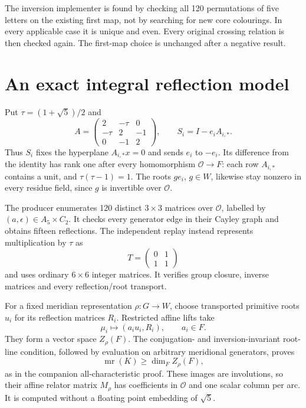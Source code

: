 \documentclass[11pt]{article}
\newcommand{\mr}{\operatorname{mr}}
\newcommand{\OO}{\mathcal O}
\begin{document}
The inversion implementer is found by checking all 120 permutations
of five letters on the existing first map, not by searching for new
core colourings. In every applicable case it is unique and even.
Every original crossing relation is then checked again. The first-map
choice is unchanged after a negative result.

\section{An exact integral reflection model}

Put $\tau=(1+\sqrt5)/2$ and
\[
 A=\begin{pmatrix}2&-\tau&0\\-\tau&2&-1\\0&-1&2\end{pmatrix},
 \qquad S_i=I-e_i A_{i,*}.
\]
Thus $S_i$ fixes the hyperplane $A_{i,*}x=0$ and sends $e_i$ to
$-e_i$. Its difference from the identity has rank one after every
homomorphism $\OO\to F$: each row $A_{i,*}$ contains a unit, and
$\tau(\tau-1)=1$. The roots $g e_i$, $g\in W$, likewise stay nonzero
in every residue field, since $g$ is invertible over $\OO$.

The producer enumerates 120 distinct $3\times3$ matrices over $\OO$,
labelled by $(a,\epsilon)\in A_5\times C_2$. It checks every generator
edge in their Cayley graph and obtains fifteen reflections. The
independent replay instead represents multiplication by $\tau$ as
\[
                  T=\begin{pmatrix}0&1\\1&1\end{pmatrix}
\]
and uses ordinary $6\times6$ integer matrices. It verifies group
closure, inverse matrices and every reflection/root transport.

For a fixed meridian representation $\rho:G\to W$, choose transported
primitive roots $u_i$ for its reflection matrices $R_i$. Restricted
affine lifts take
\[
                  \mu_i\longmapsto (a_i u_i,R_i),\qquad a_i\in F.
\]
They form a vector space $Z_\rho(F)$. The conjugation- and
inversion-invariant root-line condition, followed by evaluation on
arbitrary meridional generators, proves
\[
                         \mr(K)\ge\dim_F Z_\rho(F),
\]
as in the companion all-characteristic proof. These images are
involutions, so their affine relator matrix $M_\rho$ has coefficients
in $\OO$ and one scalar column per arc. It is computed without a
floating point embedding of $\sqrt5$.
\end{document}
